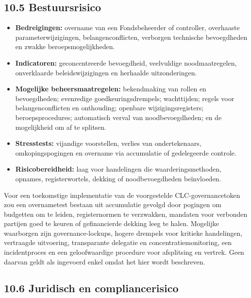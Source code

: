 \documentclass[11pt]{article}
\begin{document}
\subsection*{10.5 Bestuursrisico}

\begin{itemize}[leftmargin=*]
\item \textbf{Bedreigingen:} overname van een Fondsbeheerder of controller, overhaaste parameterwijzigingen, belangenconflicten, verborgen technische bevoegdheden en zwakke beroepsmogelijkheden.
\item \textbf{Indicatoren:} geconcentreerde bevoegdheid, veelvuldige noodmaatregelen, onverklaarde beleidswijzigingen en herhaalde uitzonderingen.
\item \textbf{Mogelijke beheersmaatregelen:} bekendmaking van rollen en bevoegdheden; evenredige goedkeuringsdrempels; wachttijden; regels voor belangenconflicten en onthouding; openbare wijzigingsregisters; beroepsprocedures; automatisch verval van noodbevoegdheden; en de mogelijkheid om af te splitsen.
\item \textbf{Stresstests:} vijandige voorstellen, verlies van ondertekenaars, omkopingspogingen en overname via accumulatie of gedelegeerde controle.
\item \textbf{Risicobereidheid:} laag voor handelingen die waarderingsmethoden, opnames, registerwortels, dekking of noodbevoegdheden beïnvloeden.
\end{itemize}
Voor een toekomstige implementatie van de voorgestelde CLC-governancetoken zou een overnametest bestaan uit accumulatie gevolgd door pogingen om budgetten om te leiden, registernormen te verzwakken, mandaten voor verbonden partijen goed te keuren of gefinancierde dekking leeg te halen. Mogelijke waarborgen zijn governance-lockups, hogere drempels voor kritieke handelingen, vertraagde uitvoering, transparante delegatie en concentratiemonitoring, een incidentproces en een geloofwaardige procedure voor afsplitsing en vertrek. Geen daarvan geldt als ingevoerd enkel omdat het hier wordt beschreven.

\subsection*{10.6 Juridisch en compliancerisico}
\end{document}
